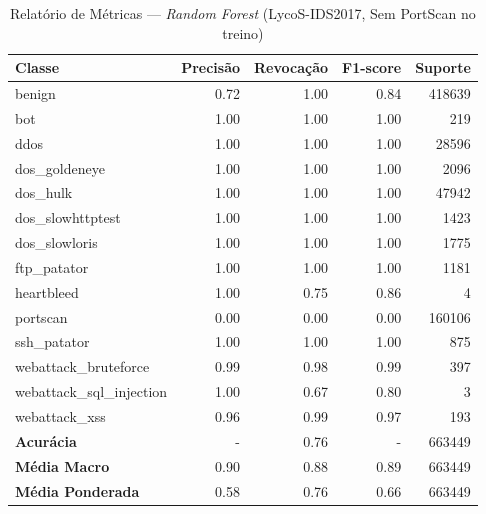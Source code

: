 \begin{table}[H]
    \centering
    \small
    \begin{tabular}{lrrrr}
        \hline
        Classe                    & Precisão & Revocação & F1-score & Suporte \\
        \hline
        benign                    & 0.72     & 1.00      & 0.84     & 418639  \\
        bot                       & 1.00     & 1.00      & 1.00     & 219     \\
        ddos                      & 1.00     & 1.00      & 1.00     & 28596   \\
        dos\_goldeneye            & 1.00     & 1.00      & 1.00     & 2096    \\
        dos\_hulk                 & 1.00     & 1.00      & 1.00     & 47942   \\
        dos\_slowhttptest         & 1.00     & 1.00      & 1.00     & 1423    \\
        dos\_slowloris            & 1.00     & 1.00      & 1.00     & 1775    \\
        ftp\_patator              & 1.00     & 1.00      & 1.00     & 1181    \\
        heartbleed                & 1.00     & 0.75      & 0.86     & 4       \\
        portscan                  & 0.00     & 0.00      & 0.00     & 160106  \\
        ssh\_patator              & 1.00     & 1.00      & 1.00     & 875     \\
        webattack\_bruteforce     & 0.99     & 0.98      & 0.99     & 397     \\
        webattack\_sql\_injection & 1.00     & 0.67      & 0.80     & 3       \\
        webattack\_xss            & 0.96     & 0.99      & 0.97     & 193     \\
        \hline
        \textbf{Acurácia}         & -        & 0.76      & -        & 663449  \\
        \textbf{Média Macro}      & 0.90     & 0.88      & 0.89     & 663449  \\
        \textbf{Média Ponderada}  & 0.58     & 0.76      & 0.66     & 663449  \\
        \hline
    \end{tabular}
    \caption{Relatório de Métricas — \textit{Random Forest} (LycoS-IDS2017, Sem PortScan no treino)}
    \label{table:rf_lycos_sem_portscan_metricas}
\end{table}
